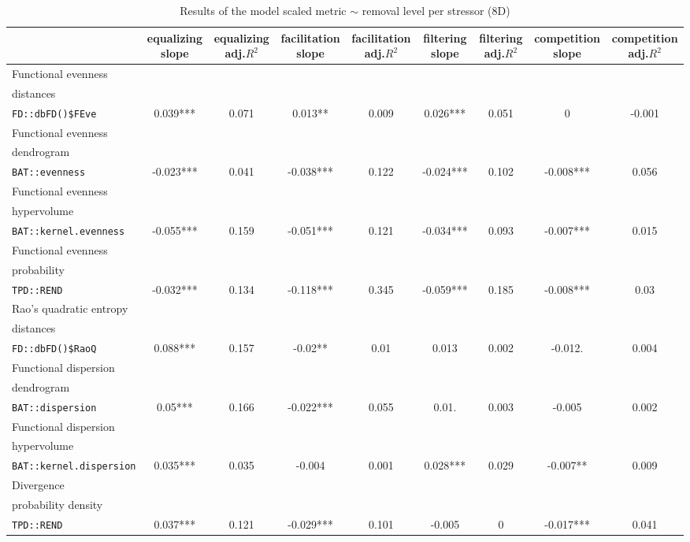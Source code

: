 \documentclass[12pt,letterpaper]{article}
\begin{document}
\begin{landscape}
\begin{table}
\scriptsize
\caption{Results of the model scaled metric $\sim$ removal level per stressor (8D)}
\centering
\begin{tabular}[t]{l|c|c|c|c|c|c|c|c}
\hline
  & equalizing slope & equalizing adj.$R^{2}$ & facilitation slope & facilitation adj.$R^{2}$ & filtering slope & filtering adj.$R^{2}$ & competition slope & competition adj.$R^{2}$\\
\hline
Functional evenness\\distances\\ \texttt{FD::dbFD()\$FEve} & 0.039*** & 0.071 & 0.013** & 0.009 & 0.026*** & 0.051 & 0 & -0.001\\
\hline
Functional evenness\\dendrogram\\ \texttt{BAT::evenness} & -0.023*** & 0.041 & -0.038*** & 0.122 & -0.024*** & 0.102 & -0.008*** & 0.056\\
\hline
Functional evenness\\hypervolume\\ \texttt{BAT::kernel.evenness} & -0.055*** & 0.159 & -0.051*** & 0.121 & -0.034*** & 0.093 & -0.007*** & 0.015\\
\hline
Functional evenness\\probability\\ \texttt{TPD::REND} & -0.032*** & 0.134 & -0.118*** & 0.345 & -0.059*** & 0.185 & -0.008*** & 0.03\\
\hline
Rao's quadratic entropy\\distances\\ \texttt{FD::dbFD()\$RaoQ} & 0.088*** & 0.157 & -0.02** & 0.01 & 0.013 & 0.002 & -0.012. & 0.004\\
\hline
Functional dispersion\\dendrogram\\ \texttt{BAT::dispersion} & 0.05*** & 0.166 & -0.022*** & 0.055 & 0.01. & 0.003 & -0.005 & 0.002\\
\hline
Functional dispersion\\hypervolume\\ \texttt{BAT::kernel.dispersion} & 0.035*** & 0.035 & -0.004 & 0.001 & 0.028*** & 0.029 & -0.007** & 0.009\\
\hline
Divergence\\probability density\\ \texttt{TPD::REND} & 0.037*** & 0.121 & -0.029*** & 0.101 & -0.005 & 0 & -0.017*** & 0.041\\

\end{tabular}
\end{table}
\end{landscape}
\end{document}
